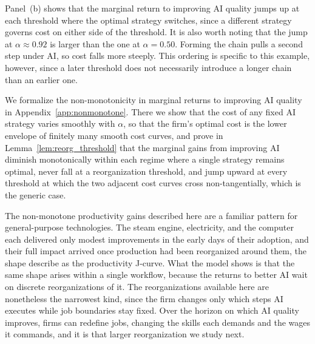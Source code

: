 \begin{example}
Panel~(b) shows that the marginal return to improving AI quality jumps up at each threshold where the optimal strategy switches, since a different strategy governs cost on either side of the threshold.
It is also worth noting that the jump at $\alpha \approx 0.92$ is larger than the one at $\alpha = 0.50$. Forming the chain pulls a second step under AI, so cost falls more steeply.
This ordering is specific to this example, however, since a later threshold does not necessarily introduce a longer chain than an earlier one.
\end{example}

We formalize the non-monotonicity in marginal returns to improving AI quality in Appendix~\ref{app:nonmonotone}.
There we show that the cost of any fixed AI strategy varies smoothly with $\alpha$, so that the firm's optimal cost is the lower envelope of finitely many smooth cost curves, and prove in Lemma~\ref{lem:reorg_threshold} that the marginal gains from improving AI diminish monotonically within each regime where a single strategy remains optimal, never fall at a reorganization threshold, and jump upward at every threshold at which the two adjacent cost curves cross non-tangentially, which is the generic case.

The non-monotone productivity gains described here are a familiar pattern for general-purpose technologies. 
The steam engine, electricity, and the computer each delivered only modest improvements in the early days of their adoption, and their full impact arrived once production had been reorganized around them, the shape \citet{brynjolfsson2021productivity} describe as the productivity J-curve.
What the model shows is that the same shape arises within a single workflow, because the returns to better AI wait on discrete reorganizations of it.
The reorganizations available here are nonetheless the narrowest kind, since the firm changes only which steps AI executes while job boundaries stay fixed.
Over the horizon on which AI quality improves, firms can redefine jobs, changing the skills each demands and the wages it commands, and it is that larger reorganization we study next.